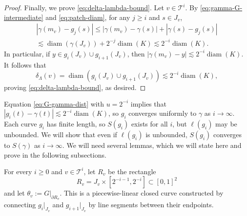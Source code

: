 \documentclass[12pt,reqno]{amsart}
\newcommand{\cT}{\mathcal{T}}
\theoremstyle{remark}
\newcommand{\0}{\mathbf{0}}
\renewcommand{\1}{\mathbf 1}
\DeclareMathOperator{\diam}{diam}
\begin{document}
\begin{proof}
  Finally, we prove \eqref{eq:delta-lambda-bound}. Let $v\in \cT^i$. By \eqref{eq:gamma-G-intermediate} and \eqref{eq:patch-diam}, for any $j\ge i$ and $s\in J_v$,
  \begin{multline*}
    |\gamma(m_v) - g_j(s)| \le |\gamma(m_v) - \gamma(s)| + |\gamma(s) - g_j(s)| \\ \lesssim \diam(\gamma(J_v)) + 2^{-j}\diam(K) \lesssim 2^{-i} \diam(K).
  \end{multline*}
  In particular, if $y \in g_{i}(J_v) \cup g_{i+1}(J_v)$, then $|\gamma(m_v) - y| \lesssim 2^{-i}\diam(K)$. It follows that
  $$\delta_\Lambda(v) = \diam(g_{i}(J_v) \cup g_{i+1}(J_v)) \lesssim 2^{-i}\diam(K),$$
  proving \eqref{eq:delta-lambda-bound}, as desired.
\end{proof}

Equation \eqref{eq:G-gamma-dist} with $u=2^{-i}$ implies that $|g_i(t) - \gamma(t)| \lesssim 2^{-i}\diam(K)$, so $g_i$ converges uniformly to $\gamma$ as $i\to \infty$. Each curve $g_i$ has finite length, so $S(g_i)$ exists for all $i$, but $\ell(g_i)$ may be unbounded. We will show that even if $\ell(g_i)$ is unbounded, $S(g_i)$ converges to $S(\gamma)$ as $i\to \infty$. We will need several lemmas, which we will state here and prove in the following subsections.

For every $i\ge 0$ and $v\in \cT^i$, let $R_v$ be the rectangle
\begin{equation}\label{eq:def-rv}
  R_v=J_v\times [2^{-i-1}, 2^{-i}] \subset [0,1]^2
\end{equation}
and let $\theta_v := G|_{\partial R_v}$. This is a piecewise-linear closed curve constructed by connecting $g_i|_{J_v}$ and $g_{i+1}|_{J_v}$ by line segments between their endpoints.
\end{document}
